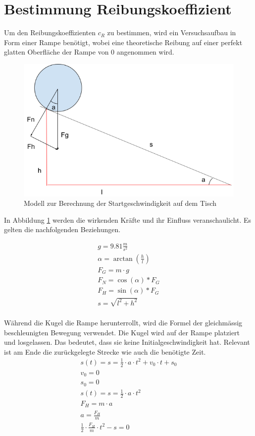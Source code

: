 \section{Bestimmung Reibungskoeffizient}\label{anhang:herleitung:reibungskoeffizient}
Um den Reibungskoeffizienten $c_R$ zu bestimmen, wird ein Versuchsaufbau in Form einer Rampe benötigt, wobei eine
theoretische Reibung auf einer perfekt glatten Oberfläche der Rampe von $0$ angenommen wird.

\begin{figure}[h!]
    \begin{center}
        \includegraphics[width=0.5\linewidth]{../common/07_appendix/resources/00_reibungskoeffizient_rampe.png}
    \end{center}
    \caption{Modell zur Berechnung der Startgeschwindigkeit auf dem Tisch}
    \label{fig:modell_berechnung_startgeschwindigkeit}
\end{figure}

In Abbildung \ref{fig:modell_berechnung_startgeschwindigkeit} werden die wirkenden Kräfte und ihr Einfluss veranschaulicht.
Es gelten die nachfolgenden Beziehungen.

\begin{align}
    g = 9.81 \frac{m}{s^2}\\
    \alpha = \arctan(\frac{h}{l})\\
    F_G = m \cdot g\\
    F_N = \cos(\alpha) * F_G\\
    F_H = \sin(\alpha) * F_G\\
    s = \sqrt{l^2 + h^2}\\
\end{align}

Während die Kugel die Rampe herunterrollt, wird die Formel der gleichmässig beschleunigten Bewegung verwendet.
Die Kugel wird auf der Rampe platziert und losgelassen. Das bedeutet, dass sie keine Initialgeschwindigkeit hat.
Relevant ist am Ende die zurückgelegte Strecke wie auch die benötigte Zeit.
\begin{align}
    s(t) = s = \frac{1}{2} \cdot a \cdot t^2 + v_0 \cdot t + s_0\\
    v_0 = 0\\
    s_0 = 0\\
    s(t) = s = \frac{1}{2} \cdot a \cdot t^2\\
    F_H = m \cdot a\\
    a = \frac{F_H}{m}\\
    \frac{1}{2} \cdot \frac{F_H}{m} \cdot t^2 - s = 0
\end{align}

